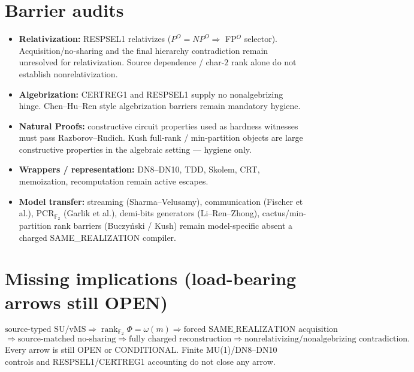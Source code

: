 \documentclass[11pt]{article}
\begin{document}
\section*{Barrier audits}
\begin{itemize}
\item \textbf{Relativization:} RESPSEL1 relativizes ($P^O=NP^O\Rightarrow$ FP$^O$
selector). Acquisition/no-sharing and the final hierarchy contradiction remain
unresolved for relativization. Source dependence / char-$2$ rank alone do not
establish nonrelativization.
\item \textbf{Algebrization:} CERTREG1 and RESPSEL1 supply no nonalgebrizing hinge.
Chen--Hu--Ren style algebrization barriers remain mandatory hygiene.
\item \textbf{Natural Proofs:} constructive circuit properties used as hardness
witnesses must pass Razborov--Rudich. Kush full-rank / min-partition objects are
large constructive properties in the algebraic setting --- hygiene only.
\item \textbf{Wrappers / representation:} DN8--DN10, TDD, Skolem, CRT, memoization,
recomputation remain active escapes.
\item \textbf{Model transfer:} streaming (Sharma--Velusamy), communication
(Fischer et al.), PCR$_{\mathbb F_2}$ (Garlik et al.), demi-bits generators
(Li--Ren--Zhong), cactus/min-partition rank barriers (Buczy\'nski / Kush) remain
model-specific absent a charged SAME\_REALIZATION compiler.
\end{itemize}

\section*{Missing implications (load-bearing arrows still OPEN)}
\[
\text{source-typed SU/vMS}
\Longrightarrow
\operatorname{rank}_{\mathbb F_2}\Phi=\omega(m)
\Longrightarrow
\text{forced SAME\_REALIZATION acquisition}
\]
\[
\Longrightarrow
\text{source-matched no-sharing}
\Longrightarrow
\text{fully charged reconstruction}
\Longrightarrow
\text{nonrelativizing/nonalgebrizing contradiction}.
\]
Every arrow is still OPEN or CONDITIONAL. Finite MU(1)/DN8--DN10 controls and
RESPSEL1/CERTREG1 accounting do not close any arrow.
\end{document}
